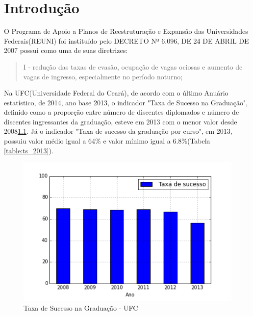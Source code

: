 \chapter{Introdução}

O Programa de Apoio a Planos de Reestruturação e Expansão das Universidades Federais(REUNI) foi instituído pelo DECRETO Nº 6.096, DE 24 DE ABRIL DE 2007  possui como uma de suas diretrizes:

\begin{quote}
I - redução das taxas de evasão, ocupação de vagas ociosas e aumento de vagas de ingresso, especialmente no período noturno;
\end{quote}

Na UFC(Universidade Federal do Ceará), de acordo com o último Anuário estatístico, de 2014, ano base 2013, o indicador "Taxa de Sucesso na Graduação", definido como a proporção entre número de discentes diplomados e número de discentes ingressantes da graduação, esteve em 2013 com o menor valor desde 2008\ref{img:taxa-de-sucesso-ufc}. Já o indicador "Taxa de sucesso da graduação por curso", em 2013, possuiu valor médio igual a 64\% e valor mínimo igual a 6.8\%(Tabela \ref{table:ts_2013}).

\begin{figure}
	\includegraphics[scale=0.8]{img/taxa-de-sucesso-ufc.png}
	\caption{Taxa de Sucesso na Graduação - UFC}
	\label{img:taxa-de-sucesso-ufc}
\end{figure}

